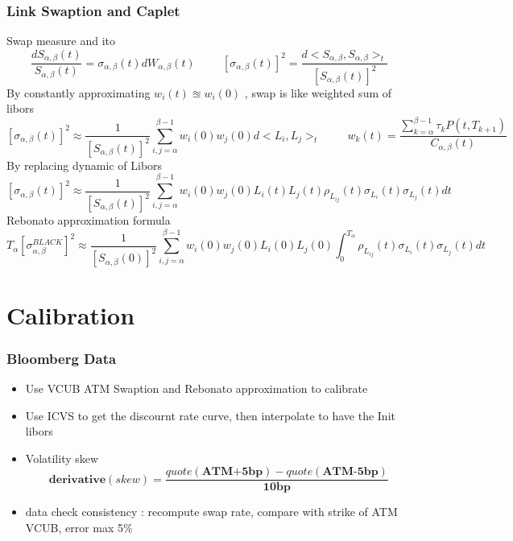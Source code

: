 \documentclass[8pt]{beamer}
\newcommand{\Ta}{T_{\alpha}}
\newcommand{\Sab}{S_{\alpha,\beta}}
\newcommand{\Cab}{C_{\alpha,\beta}}
\newcommand{\Wab}{W_{\alpha,\beta}}
\newcommand{\sigmaab}{\sigma_{\alpha,\beta}}
\begin{document}
\begin{frame}
\frametitle{Link Swaption and Caplet}
Swap measure and ito
\[
\frac{d\Sab(t)}{\Sab(t)} = \sigmaab(t)d\Wab(t)
\hspace{1cm}
[\sigmaab(t)]^2 = \frac{ d<\Sab,\Sab>_t }{[\Sab(t)]^2 }
\]
By constantly approximating $w_{i}(t)\approxeq w_{i}(0)$ , swap is like weighted sum of libors
\[
[\sigmaab(t)]^2 \approx \frac{1}{[\Sab(t)]^2 } \sum_{i,j=\alpha}^{\beta-1} w_i(0)w_j(0) d<L_i,L_j>_t
\hspace{1cm}
w_k(t) = \frac{\sum^{\beta-1}_{k=\alpha} \tau_k P(t,T_{k+1}) }{\Cab(t)}
\]
By replacing dynamic of Libors
\[
[\sigmaab(t)]^2 \approx \frac{1}{[\Sab(t)]^2 } \sum_{i,j=\alpha}^{\beta-1} w_i(0)w_j(0) L_i(t)L_j(t) \rho_{L_{ij}}(t) \sigma_{L_i}(t) \sigma_{L_j}(t) dt
\]
Rebonato approximation formula
\[
\Ta[\sigma^{BLACK}_{\alpha,\beta}]^2 \approx \frac{1}{[\Sab(0)]^2 } \sum_{i,j=\alpha}^{\beta-1} w_i(0)w_j(0)L_i(0)L_j(0) 
\int_{0}^{\Ta} \rho_{L_{ij}}(t) \sigma_{L_i}(t) \sigma_{L_j}(t) dt
\]
\end{frame}


\section{Calibration}
\begin{frame}
\frametitle{Bloomberg Data}
\begin{itemize}
\item Use VCUB ATM Swaption and Rebonato approximation to calibrate 
\item Use ICVS to get the discournt rate curve, then interpolate to have the Init libors 
\item Volatility skew
\[
\textbf{derivative}(skew) = \frac{quote (\textbf{ATM+5bp}) - quote(\textbf{ATM-5bp}) }{\textbf{10bp}}
\]
\item data check consistency : recompute swap rate, compare with strike of ATM VCUB, error max 5\%
\end{itemize}
\end{frame}
\end{document}
